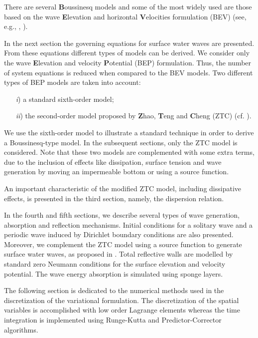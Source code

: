 
There are several {\bf B}oussinesq models and some of the most widely
used are those based on the wave {\bf E}levation and horizontal {\bf
V}elocities formulation (BEV) (see, e.g., \cite{LiuWoo04},
\cite{WalMar02}).

In the next section  the governing equations for
surface water waves are presented.
From these equations  different types of models can be derived.
We  consider only  the wave {\bf E}levation and  velocity
{\bf P}otential  (BEP) formulation. 
Thus, the  number of system 
equations is reduced when
compared to the BEV models.
Two  different types of BEP models are taken into account: 
\begin{itemize}
\item[{\it i})] a standard sixth-order model;
\item[{\it ii})] the second-order model proposed by {\bf Z}hao, {\bf T}eng
and {\bf C}heng (ZTC) (cf. \cite{ZhaTen04}).
\end{itemize}
We use the sixth-order model to  illustrate a standard
technique in order to  derive a  Boussinesq-type model.
In the subsequent sections, only the ZTC model is
considered.
Note  that these two models 
 are complemented with some extra terms, due to the
inclusion of effects like dissipation, surface tension and  wave
generation by moving an impermeable bottom or using a source function.
 
An important characteristic of the modified ZTC model,
including dissipative effects, 
is presented in the third section, namely,
 the dispersion relation.
 
In the fourth and fifth sections, we describe several types of
wave generation, absorption and reflection mechanisms. 
Initial conditions for a solitary wave  and a periodic wave
induced by Dirichlet boundary conditions are also presented. 
Moreover, we  complement the ZTC model using a  source
function  to generate surface water waves, as  proposed in \cite{WeiKir99}.
Total reflective walls are modelled by standard zero Neumann
conditions for the surface elevation and velocity potential.
The wave energy absorption is simulated using sponge layers. 

The following section is dedicated to the 
numerical methods used in the discretization of the
variational formulation.
The discretization of the spatial variables  is accomplished
with low order Lagrange elements  whereas   the time integration 
is implemented using  Runge-Kutta and Predictor-Corrector algorithms. 

